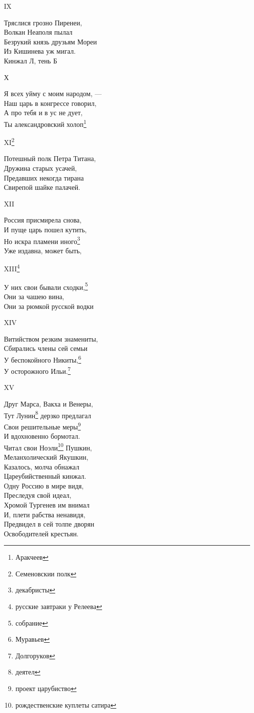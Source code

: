 IX

Тряслися грозно Пиренеи,\\
Волкан Неаполя пылал\\
Безрукий князь друзьям Мореи\\
Из Кишинева уж мигал.\\
Кинжал Л, тень Б

Х

Я всех уйму с моим народом, —\\
Наш царь в конгрессе говорил,\\
А про тебя и в ус не дует,\\
Ты александровский холоп\footnote{Аракчеев}

XI\footnote{Семеновскии полк}

Потешный полк Петра Титана,\\
Дружина старых усачей,\\
Предавших некогда тирана\\
Свирепой шайке палачей.

XII

Россия присмирела снова,\\
И пуще царь пошел кутить,\\
Но искра пламени иного\footnote{декабристы}\\
Уже издавна, может быть,

XIII\footnote{русские завтраки у Релеева}

У них свои бывали сходки,\footnote{собрание}\\
Они за чашею вина,\\
Они за рюмкой русской водки

XIV

Витийством резким знамениты,\\
Сбирались члены сей семьи\\
У беспокойного Никиты,\footnote{Муравьев}\\
У осторожного Ильи.\footnote{Долгоруков}

XV

Друг Марса, Вакха и Венеры,\\
Тут Лунин\footnote{деятел} дерзко предлагал\\
Свои решительные меры\footnote{проект царубиство}\\
И вдохновенно бормотал.\\
Читал свои Ноэли\footnote{рождественские куплеты сатира} Пушкин,\\
Меланхолический Якушкин,\\
Казалось, молча обнажал\\
Цареубийственный кинжал.\\
Одну Россию в мире видя,\\
Преследуя свой идеал,\\
Хромой Тургенев им внимал\\
И, плети рабства ненавидя,\\
Предвидел в сей толпе дворян\\
Освободителей крестьян.


